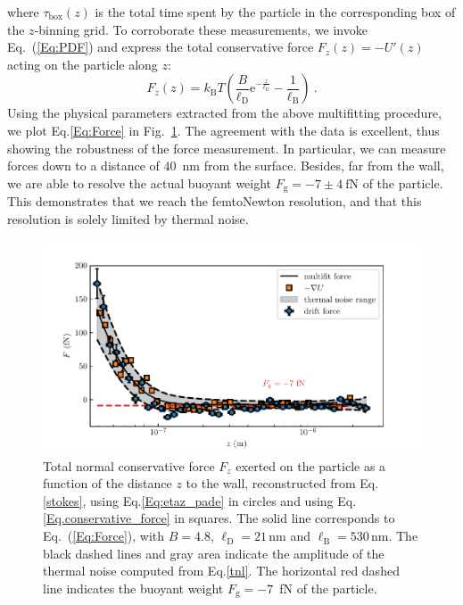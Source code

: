 where $\tau_{\textrm{box}}(z)$ is the total time spent by the particle in the corresponding box of the $z$-binning grid. To corroborate these measurements, we invoke Eq.~(\ref{Eq:PDF}) and express the total conservative force $F_z(z)=-U'(z)$ acting on the particle along $z$:
\begin{equation}
	\displaystyle F_z(z) =  k_{\mathrm{B}}T\left(\frac{B}{\ell_\mathrm{D}} \textrm{e}^{-\frac{z}{\ell_\mathrm{D}}} - \frac{1}{\ell_\mathrm{B}}\right)\ .
	\label{Eq:Force}
\end{equation} 
Using the physical parameters extracted from the above multifitting procedure, we plot Eq.\ref{Eq:Force} in Fig.~\ref{fig.figure_force_total}. The agreement with the data is excellent, thus showing the robustness of the force measurement. In particular, we can measure forces down to a distance of $40$~nm from the surface. Besides, far from the wall, we are able to resolve the actual buoyant weight $F_{\textrm{g}} =- 7  \pm 4 ~ \mathrm{fN}$ of the particle. This demonstrates that we reach the femtoNewton resolution, and that this resolution is solely limited by thermal noise.
\begin{figure}[H]
	\centering
	\includegraphics{02_body/chapter3/images/trajctory_analysis/figure_force_total.pdf}
	\caption{Total normal conservative force $F_z$ exerted on the particle as a function of the distance $z$ to the wall, reconstructed from Eq.\ref{stokes}, using Eq.\ref{Eq:etaz_pade} in circles and using Eq.\ref{Eq.conservative_force} in squares. The solid line corresponds to Eq.~(\ref{Eq:Force}), with $B=4.8$, $\ell_{\mathrm{D}}=21\,\mathrm{nm}$ and $\ell_{\mathrm{B}}=530\,\mathrm{nm}$. The black dashed lines and gray area indicate the amplitude of the thermal noise computed from Eq.\ref{tnl}. The horizontal red dashed line indicates the buoyant weight $F_{\textrm{g}}=-7$~fN of the particle.}
	\label{fig.figure_force_total}
\end{figure}

